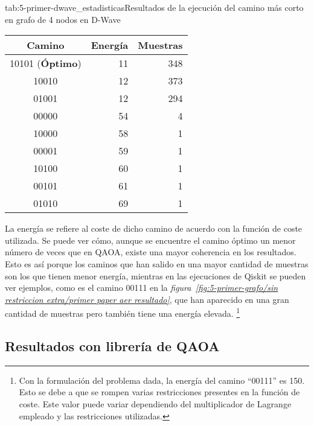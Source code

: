 \begin{table}[htbp]{tab:5-primer-dwave_estadisticas}{Resultados de la ejecución del camino más corto en grafo de 4 nodos en D-Wave}
  \centering
  \begin{tabular}{|c|r|r|}
    \hline
    \textbf{Camino}         & \textbf{Energía} & \textbf{Muestras} \\ \hline
    10101 (\textbf{Óptimo}) & 11               & 348               \\ \hline
    10010                   & 12               & 373               \\ \hline
    01001                   & 12               & 294               \\ \hline
    00000                   & 54               &   4               \\ \hline
    10000                   & 58               &   1               \\ \hline
    00001                   & 59               &   1               \\ \hline
    10100                   & 60               &   1               \\ \hline
    00101                   & 61               &   1               \\ \hline
    01010                   & 69               &   1               \\ \hline
  \end{tabular}
\end{table}

La energía se refiere al coste de dicho camino de acuerdo con la función de coste utilizada.
Se puede ver cómo, aunque se encuentre el camino óptimo un menor número de veces que en QAOA, existe una mayor coherencia en los resultados.
Esto es así porque los caminos que han salido en una mayor cantidad de muestras son los que tienen menor energía, mientras en las ejecuciones de Qiskit se pueden ver ejemplos, como es el camino 00111 en la
\textit{figura~\ref{fig:5-primer-grafo/sin restriccion extra/primer paper aer resultado}}, que han aparecido en una gran cantidad de muestras pero también tiene una energía elevada.
\footnote{
  Con la formulación del problema dada, la energía del camino ``00111'' es 150.
  Esto se debe a que se rompen varias restricciones presentes en la función de coste.
  Este valor puede variar dependiendo del multiplicador de Lagrange empleado
  y las restricciones utilizadas.
}


\subsection{Resultados con librería de QAOA}

